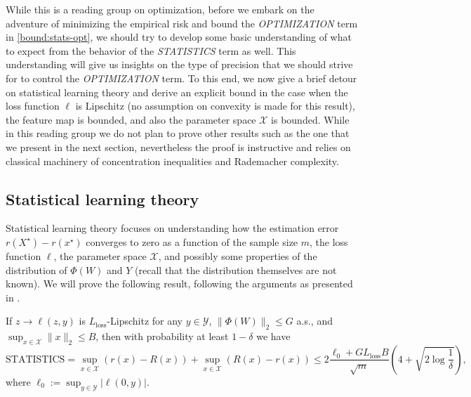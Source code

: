 While this is a reading group on optimization, before we embark on the adventure of minimizing the empirical risk and bound the \emph{OPTIMIZATION} term in \eqref{bound:stats-opt}, we should try to develop some basic understanding of what to expect from the behavior of the \emph{STATISTICS} term as well. This understanding will give us insights on the type of precision that we should strive for to control the \emph{OPTIMIZATION} term. To this end, we now give a brief detour on statistical learning theory and derive an explicit bound in the case when the loss function $\ell$ is Lipschitz (no assumption on convexity is made for this result), the feature map is bounded, and also the parameter space $\mathcal{X}$ is bounded. While in this reading group we do not plan to prove other results such as the one that we present in the next section, nevertheless the proof is instructive and relies on classical machinery of concentration inequalities and Rademacher complexity.

\subsection{Statistical learning theory}
\label{sec:Statistical learning theory}
Statistical learning theory focuses on understanding how the estimation error $r(X^\star) - r(x^\star)$ converges to zero as a function of the sample size $m$, the loss function $\ell$, the parameter space $\mathcal{X}$, and possibly some properties of the distribution of $\Phi(W)$ and $Y$ (recall that the distribution themselves are not known). We will prove the following result, following the arguments as presented in \cite{bach}.

\begin{proposition}
\label{prop:Lip-stats}
If $z\rightarrow \ell(z,y)$ is $L_\textrm{loss}$-Lipschitz for any $y\in\mathcal{Y}$, $\|\Phi(W)\|_2\le G$ a.s., and $\sup_{x\in\mathcal{X}}\|x\|_2 \le B$, then with probability at least $1-\delta$ we have
$$
	\textrm{STATISTICS} = \sup_{x\in\mathcal{X}} ( r(x) - R(x) ) + \sup_{x\in\mathcal{X}} ( R(x) - r(x) )
	\le 2\frac{\ell_0+GL_\textrm{loss}B}{\sqrt{m}}\left(4 + \sqrt{2\log \frac{1}{\delta}} \right),
$$
where $\ell_0:=\sup_{y\in\mathcal{Y}} | \ell(0,y) |$.
\end{proposition}

